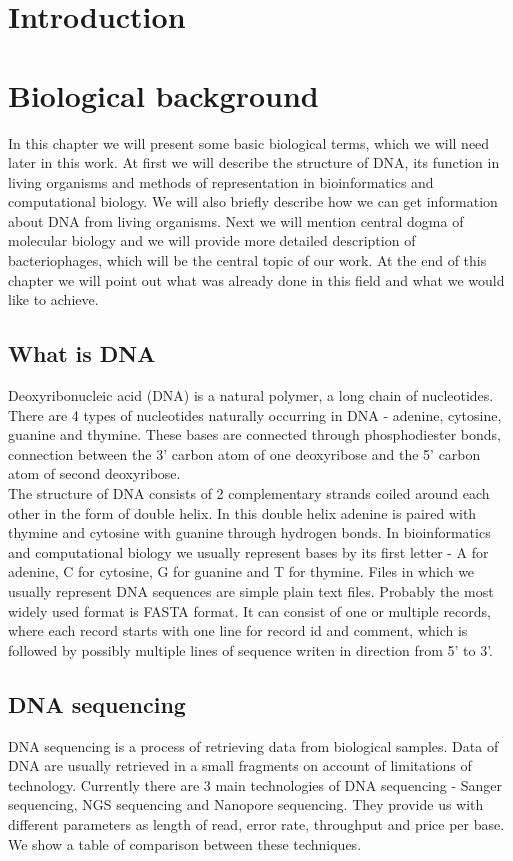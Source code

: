 \chapter*{Introduction}

\chapter{Biological background}
In this chapter we will present some basic biological terms, which we will need later in this work.
At first we will describe the structure of DNA, its function in living organisms
and methods of representation in bioinformatics and computational biology.
We will also briefly describe how we can get information about DNA from living organisms.
Next we will mention central dogma of molecular biology and we will provide more detailed description of bacteriophages,
which will be the central topic of our work. At the end of this chapter we will point out what was already done in this field
and what we would like to achieve.

\section{What is DNA}
Deoxyribonucleic acid (DNA) is a natural polymer, a long chain of nucleotides. There are 4 types of nucleotides
naturally occurring in DNA - adenine, cytosine, guanine and thymine. These bases are connected through phosphodiester bonds,
connection between the 3' carbon atom of one deoxyribose and the 5' carbon atom of second deoxyribose. \\
The structure of DNA consists of 2 complementary strands coiled around each other in the form of double helix.
In this double helix adenine is paired with thymine and cytosine with guanine through hydrogen bonds.
In bioinformatics and computational biology we usually represent bases by its first letter - A for adenine, C for cytosine, G for guanine and T for thymine.
Files in which we usually represent DNA sequences are simple plain text files. Probably the most widely used format is FASTA format.
It can consist of one or multiple records, where each record starts with one line for record id and comment, which is followed by possibly multiple lines of sequence writen in direction from 5' to 3'.

\section{DNA sequencing}
DNA sequencing is a process of retrieving data from biological samples.
Data of DNA are usually retrieved in a small fragments on account of limitations of technology.
Currently there are 3 main technologies of DNA sequencing - Sanger sequencing, NGS sequencing and Nanopore sequencing.
They provide us with different parameters as length of read, error rate, throughput and price per base.
We show a table of comparison between these techniques.

